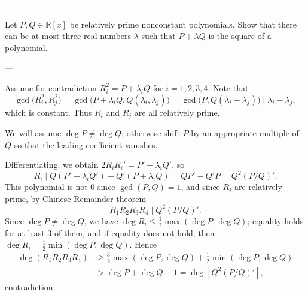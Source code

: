 
---

Let $P,Q\in\mathbb R[x]$ be relatively prime nonconstant polynomials. Show that there can be at most three real numbers $\lambda$ such that $P+\lambda Q$ is the square of a polynomial.

---

Assume for contradiction $R_i^2=P+\lambda_iQ$ for $i=1,2,3,4$. Note that \[\gcd\big(R_i^2,R_j^2\big)=\gcd\big(P+\lambda_iQ,Q(\lambda_i,\lambda_j)\big)=\gcd\big(P,Q(\lambda_i-\lambda_j)\big)\mid \lambda_i-\lambda_j,\]
which is constant. Thus $R_i$ and $R_j$ are all relatively prime.

We will assume $\deg P\ne\deg Q$; otherwise shift $P$ by an appropriate multiple of $Q$ so that the leading coefficient vanishes.

Differentiating, we obtain $2R_iR_i'=P'+\lambda_iQ'$, so \[R_i\mid Q(P'+\lambda_iQ')-Q'(P+\lambda_iQ)=QP'-Q'P=Q^2(P/Q)'.\]
This polynomial is not $0$ since $\gcd(P,Q)=1$, and since $R_i$ are relatively prime, by Chinese Remainder theorem \[R_1R_2R_3R_4\mid Q^2(P/Q)'.\]
Since $\deg P\ne \deg Q$, we have $\deg R_i\le\tfrac12\max(\deg P,\deg Q)$; equality holds for at least $3$ of them, and if equality does not hold, then $\deg R_i=\tfrac12\min(\deg P,\deg Q)$. Hence
\begin{align*}
\deg(R_1R_2R_3R_4)&\ge\tfrac32\max(\deg P,\deg Q)+\tfrac12\min(\deg P,\deg Q)\\
&>\deg P+\deg Q-1=\deg\left[Q^2(P/Q)'\right],
\end{align*}
contradiction.

